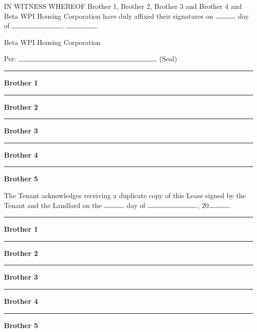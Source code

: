 \documentclass[12pt]{article}
\newcommand\signature[1]{%
\begin{minipage}{5cm}
    \noindent
    \noindent\vspace{2cm}\par
    \noindent\rule{5cm}{1pt}\par
    \noindent\textbf{#1}\par
\end{minipage}}
\begin{document}
\clearpage

IN WITNESS WHEREOF Brother 1, Brother 2, Brother 3 and Brother 4 and Beta WPI
Housing Corporation have duly affixed their signatures on $\rule{1cm}{0.15mm}$
day of $\rule{2.5cm}{0.15mm}$, $\rule{1.5cm}{0.15mm}$.
  	

\begin{flushright} Beta WPI Housing Corporation

\vspace{1cm}

Per: $\rule{7cm}{0.15mm}$ (Seal)
  	

\signature{Brother 1}

\signature{Brother 2}

\signature{Brother 3}

\signature{Brother 4}

\signature{Brother 5} \end{flushright}

\clearpage

The Tenant acknowledges receiving a duplicate copy of this Lease signed by the
Tenant and the Landlord on the $\rule{1cm}{0.15mm}$ day of
$\rule{2.5cm}{0.15mm}$, 20$\rule{1cm}{0.15mm}$.
  	
\begin{flushright}

\signature{Brother 1}

\signature{Brother 2}

\signature{Brother 3}

\signature{Brother 4}

\signature{Brother 5}

\end{flushright}
\end{document}
